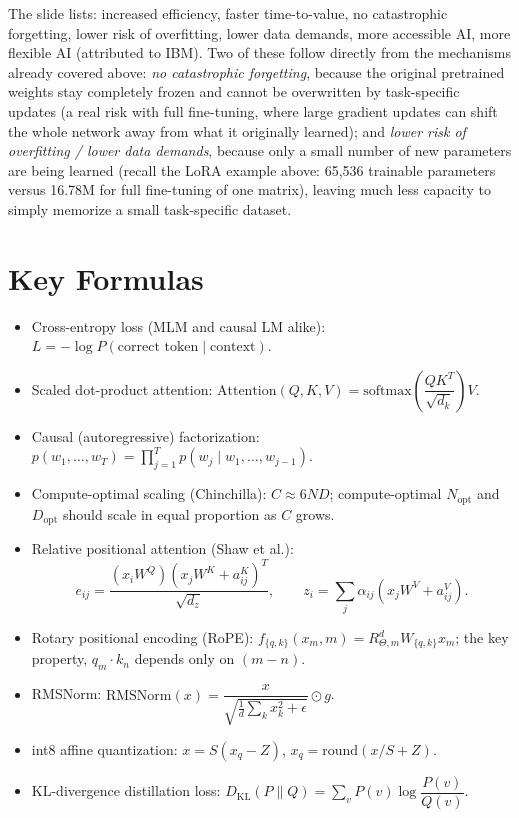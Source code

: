 \documentclass[11pt]{article}
\begin{document}
The slide lists: increased efficiency, faster time-to-value, no catastrophic forgetting, lower risk of overfitting, lower data demands, more accessible AI, more flexible AI (attributed to IBM). Two of these follow directly from the mechanisms already covered above: \emph{no catastrophic forgetting}, because the original pretrained weights stay completely frozen and cannot be overwritten by task-specific updates (a real risk with full fine-tuning, where large gradient updates can shift the whole network away from what it originally learned); and \emph{lower risk of overfitting / lower data demands}, because only a small number of new parameters are being learned (recall the LoRA example above: 65{,}536 trainable parameters versus 16.78M for full fine-tuning of one matrix), leaving much less capacity to simply memorize a small task-specific dataset.

\section{Key Formulas}

\begin{itemize}
\item Cross-entropy loss (MLM and causal LM alike): $L = -\log P(\text{correct token} \mid \text{context})$.
\item Scaled dot-product attention: $\text{Attention}(Q,K,V) = \text{softmax}\!\left(\dfrac{QK^T}{\sqrt{d_k}}\right)V$.
\item Causal (autoregressive) factorization: $p(w_1,\dots,w_T) = \prod_{j=1}^{T} p(w_j \mid w_1,\dots,w_{j-1})$.
\item Compute-optimal scaling (Chinchilla): $C \approx 6ND$; compute-optimal $N_{\text{opt}}$ and $D_{\text{opt}}$ should scale in equal proportion as $C$ grows.
\item Relative positional attention (Shaw et al.):
\[
e_{ij} = \frac{(x_iW^Q)(x_jW^K+a_{ij}^K)^T}{\sqrt{d_z}}, \qquad z_i = \sum_j \alpha_{ij}(x_jW^V + a_{ij}^V).
\]
\item Rotary positional encoding (RoPE): $f_{\{q,k\}}(x_m,m) = R^d_{\Theta,m}W_{\{q,k\}}x_m$; the key property, $q_m\cdot k_n$ depends only on $(m-n)$.
\item RMSNorm: $\text{RMSNorm}(x) = \dfrac{x}{\sqrt{\frac{1}{d}\sum_k x_k^2+\epsilon}}\odot g$.
\item int8 affine quantization: $x = S(x_q-Z)$, \quad $x_q = \text{round}(x/S+Z)$.
\item KL-divergence distillation loss: $D_{\mathrm{KL}}(P\|Q) = \sum_v P(v)\log\dfrac{P(v)}{Q(v)}$.
\end{itemize}
\end{document}
